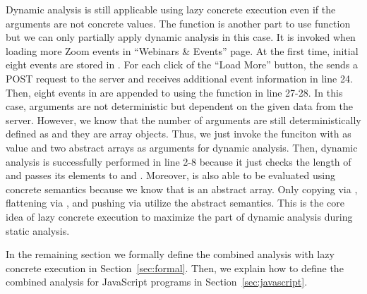 Dynamic analysis is still applicable using lazy concrete execution even if the
arguments are not concrete values.  The  function is another
part to use  function but we can only partially apply dynamic
analysis in this case.  It is invoked when loading more Zoom events in
``Webinars \& Events'' page.  At the first time, initial eight events are stored
in .  For each click of the ``Load More'' button, the
 sends a POST request to the server and receives additional
event information  in line 24.  Then, eight events in
 are appended to  using the
 function in line 27-28.  In this case, arguments are not
deterministic but dependent on the given data from the server.  However, we know
that the number of arguments are still deterministically defined as 
and they are array objects.  Thus, we just invoke the funciton 
with \jscode{\_} as  value and two abstract arrays as arguments for
dynamic analysis.  Then, dynamic analysis is successfully performed in line 2-8
because it just checks the length of  and passes its elements
to  and .  Moreover,  is also
able to be evaluated using concrete semantics because we know that 
is an abstract array.  Only copying via , flattening via
, and pushing via  utilize the abstract
semantics.  This is the core idea of lazy concrete execution to maximize the
part of dynamic analysis during static analysis.

In the remaining section we formally define the combined analysis with lazy
concrete execution in Section~\ref{sec:formal}.  Then, we explain how to define
the combined analysis for JavaScript programs in Section~\ref{sec:javascript}.
